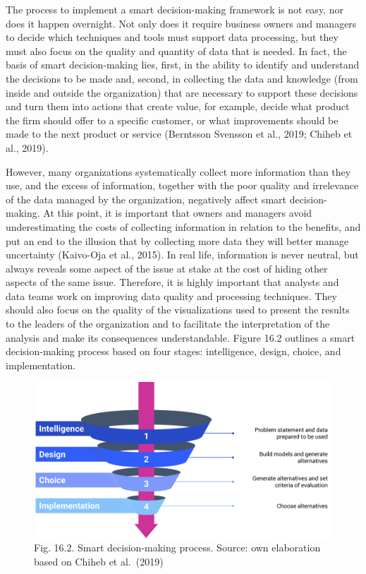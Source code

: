 \documentclass[
  letterpaper,
  DIV=11,
  numbers=noendperiod]{scrreprt}
\begin{document}
The process to implement a smart decision-making framework is not easy,
nor does it happen overnight. Not only does it require business owners
and managers to decide which techniques and tools must support data
processing, but they must also focus on the quality and quantity of data
that is needed. In fact, the basis of smart decision-making lies, first,
in the ability to identify and understand the decisions to be made and,
second, in collecting the data and knowledge (from inside and outside
the organization) that are necessary to support these decisions and turn
them into actions that create value, for example, decide what product
the firm should offer to a specific customer, or what improvements
should be made to the next product or service (Berntsson Svensson et
al., 2019; Chiheb et al., 2019).

However, many organizations systematically collect more information than
they use, and the excess of information, together with the poor quality
and irrelevance of the data managed by the organization, negatively
affect smart decision-making. At this point, it is important that owners
and managers avoid underestimating the costs of collecting information
in relation to the benefits, and put an end to the illusion that by
collecting more data they will better manage uncertainty (Kaivo-Oja et
al., 2015). In real life, information is never neutral, but always
reveals some aspect of the issue at stake at the cost of hiding other
aspects of the same issue. Therefore, it is highly important that
analysts and data teams work on improving data quality and processing
techniques. They should also focus on the quality of the visualizations
used to present the results to the leaders of the organization and to
facilitate the interpretation of the analysis and make its consequences
understandable. Figure 16.2 outlines a smart decision-making process
based on four stages: intelligence, design, choice, and implementation.

\begin{figure}

{\centering \includegraphics{img/fig26.png}

}

\caption{Fig. 16.2. Smart decision-making process. Source: own
elaboration based on Chiheb et al.~(2019)}

\end{figure}
\end{document}
